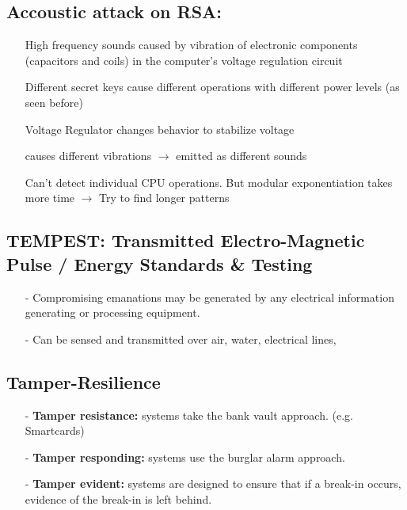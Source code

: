 \subsection{Accoustic attack on RSA: }
\begin{itemize}
    \item[]High frequency sounds caused by vibration of
    electronic components (capacitors and coils) in the
    computer’s voltage regulation circuit
    \item[]Different secret keys cause different operations with different power levels (as seen before)
    \item[]Voltage Regulator changes behavior to stabilize voltage
    \item[]causes different vibrations $\rightarrow$ emitted as different sounds
    \item[]Can’t detect individual CPU operations. But modular exponentiation takes more time $\rightarrow$ Try to find longer patterns
\end{itemize}

\subsection{TEMPEST: Transmitted Electro-Magnetic Pulse / Energy Standards & Testing}

\begin{itemize}
    \item[-]Compromising emanations may be generated by any electrical information generating or processing equipment.
    \item[-]Can be sensed and transmitted over air, water, electrical lines,
\end{itemize}

\subsection{Tamper-Resilience}

\begin{itemize}
    \item[-]\textbf{Tamper resistance: }systems take the bank vault approach. (e.g. Smartcards)
    \item[-]\textbf{Tamper responding: }systems use the burglar alarm approach.
    \item[-]\textbf{Tamper evident: }systems are designed to ensure that if a break-in occurs, evidence of the break-in is left behind.
\end{itemize}

